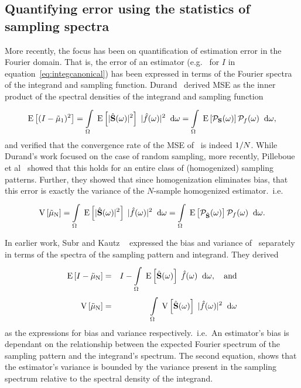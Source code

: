 \subsection{Quantifying error using the statistics of sampling spectra}
More recently, the focus has been on quantification of estimation error in the Fourier domain. That is, the error of an estimator (e.g.~ for $I$ in equation~\ref{eq:integcanonical}) has been expressed in terms of the Fourier spectra of the integrand and sampling function. 
Durand~\cite{FredoTR} derived MSE as the inner product of the spectral densities of the integrand and sampling function
\begin{equation} \label{eq:durand11}
   \mathrm{E} \left[(I-\tilde\mu_\mathrm{1})^2 \right] = \displaystyle\int\limits_{\Omega}^{} \; \mathrm{E} \left[|\hat{\mathbf{S}}(\omega)|^2 \right] \; |\hat{f}(\omega)|^2  \;\; \mathrm{d}\omega = \displaystyle\int\limits_{\Omega}^{} \; \mathrm{E} \left[\mathcal{P}_{\mathbf{S}}(\omega) \right] \mathcal{P}_{f}(\omega) \;\; \mathrm{d}\omega ,
\end{equation}
and verified that the convergence rate of the MSE of \estim{\N}\ is indeed $1/N$. While Durand's work focused on the case of random sampling, more recently, Pilleboue et al~\cite{Pilleboue:2015:VAM} showed that this holds for an entire class of (homogenized) sampling patterns. Further, they showed that since homogenization eliminates bias, that this error is exactly the variance of the $N$-sample homogenized estimator.~i.e.
\begin{equation} \label{eq:pillebouevar}
\mathrm{V} \left[\tilde\mu_\mathrm{N}\right] 
= \displaystyle\int\limits_{\Omega}^{} \; \mathrm{E} \left[|\hat{\mathbf{S}}(\omega)|^2 \right]\;|\hat{f}(\omega)|^2 \;\; \mathrm{d}\omega 
= \displaystyle\int\limits_{\Omega}^{} \; \mathrm{E} \left[\mathcal{P}_{\hat{\mathbf{S}}}(\omega) \right] \mathcal{P}_{f}(\omega) \;\; \mathrm{d}\omega. 
\end{equation}

In earlier work, Subr and Kautz ~\cite{Subr:2013:FAS} expressed the bias and variance of \estim{\N}\ separately in terms of the spectra of the sampling pattern and integrand. They derived
\begin{eqnarray}
  \mathrm{E} \left[I-\tilde\mu_\mathrm{N} \right] &=& I - \displaystyle\int\limits_{\Omega}^{} \; \mathrm{E} \left[\hat{\mathbf{S}}(\omega) \right] \; \hat{f}(\omega)  \;\; \mathrm{d}\omega, \quad \mathrm{and} \\
    \mathrm{V} \left[\tilde\mu_\mathrm{N}\right] &=& \displaystyle\int\limits_{\Omega}^{} \; \mathrm{V} \left[\hat{\mathbf{S}}(\omega)\right] \; |\hat{f}(\omega)|^2 \;\; \mathrm{d}\omega
\end{eqnarray}
as the expressions for bias and variance respectively.~i.e.~An estimator's bias is dependant on the relationship between the expected Fourier spectrum of the sampling pattern and the integrand's spectrum. The second equation, shows that the estimator's variance is bounded by the variance present in the sampling spectrum relative to the spectral density of the integrand. 

